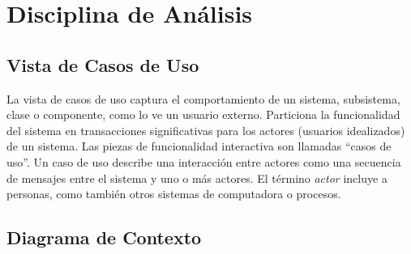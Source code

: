 
\chapter{Disciplina de Análisis}
\label{chap:analisis}

\section{Vista de Casos de Uso}

La vista de casos de uso captura el comportamiento de un sistema, subsistema, clase o componente, como lo ve un usuario externo. Particiona la funcionalidad del sistema en transacciones significativas para los actores (usuarios idealizados) de un sistema. Las piezas de funcionalidad interactiva son llamadas ``casos de uso''. Un caso de uso describe una interacción entre actores como una secuencia de mensajes entre el sistema y uno o más actores. El término \emph{actor} incluye a personas, como también otros sistemas de computadora o procesos.

\section{Diagrama de Contexto}

